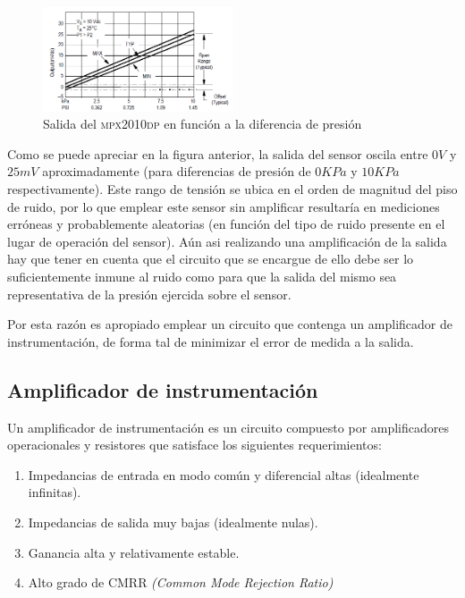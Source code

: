 \begin{figure}[H]
    \centering
    \includegraphics[width=0.5\textwidth]{../EJ4/resources/mpx2010dp_out.png}
    \caption{Salida del \textsc{mpx2010dp} en funci\'on a la diferencia de presi\'on}
    \label{fig:EJ4_mpx2010dp_out}
\end{figure}

Como se puede apreciar en la figura anterior, la salida del sensor oscila entre $0V$ y $25mV$ aproximadamente (para diferencias de presi\'on de $0KPa$ y $10KPa$ respectivamente). Este rango de tensi\'on se ubica en el orden de magnitud del piso de ruido, por lo que emplear este sensor sin amplificar resultar\'ia en mediciones err\'oneas y probablemente aleatorias (en funci\'on del tipo de ruido presente en el lugar de operaci\'on del sensor). A\'un asi realizando una amplificaci\'on de la salida hay que tener en cuenta que el circuito que se encargue de ello debe ser lo suficientemente inmune al ruido como para que la salida del mismo sea representativa de la presi\'on ejercida sobre el sensor.


Por esta raz\'on es apropiado emplear un circuito que contenga un amplificador de instrumentaci\'on, de forma tal de minimizar el error de medida a la salida. 

\subsection{Amplificador de instrumentaci\'on}

Un amplificador de instrumentaci\'on es un circuito compuesto por amplificadores operacionales y resistores que satisface los siguientes requerimientos:

\begin{enumerate}
		\item Impedancias de entrada en modo com\'un y diferencial altas (idealmente infinitas).
		\item Impedancias de salida muy bajas (idealmente nulas).
		\item Ganancia alta y relativamente estable.
		\item Alto grado de CMRR \textit{(Common Mode Rejection Ratio)}
\end{enumerate}

